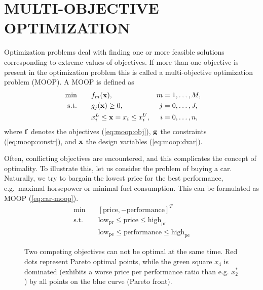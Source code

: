 \documentclass[%
preprint,
preprint,
linenumbers,
amsmath,amssymb,
aps,
prstab,
]{revtex4-1}
\begin{document}
\section{MULTI-OBJECTIVE OPTIMIZATION} \label{sec:optimization}

Optimization problems deal with finding one or more feasible solutions
  corresponding to extreme values of objectives.
If more than one objective is present in the optimization problem this is called
  a multi-objective optimization problem (MOOP).
A MOOP is defined as
%
\begin{align}
  \text{ min} \quad & \quad f_m({\bf x}), ~& m &= 1, \dots, M, \label{eq:moop:obj}\\
  \text{s.t.} \quad & \quad g_j({\bf x}) \geq 0, & j &= 0, \dots, J,
  \label{eq:moop:constr}\\
  \quad & \quad  x_i^L \leq {\bf x}=x_i \leq x_i^U,& i &=0, \dots, n
  \label{eq:moop:dvar} \text{,}
\end{align}
%
where $\bf f$ denotes the objectives (\ref{eq:moop:obj}),
  $\bf g$ the constraints (\ref{eq:moop:constr}),
  and $\bf x$ the design variables (\ref{eq:moop:dvar}).

Often, conflicting objectives are encountered, and this complicates the concept of
  optimality.
To illustrate this, let us consider the problem of buying a car.
Naturally, we try to bargain the lowest price for the best performance,
  e.g.\ maximal horsepower or minimal fuel consumption.
This can be formulated as MOOP (\ref{eq:car-moop}).
%
\begin{equation}
  \begin{array}{cl}
  \min          & \quad \left[ \text{price}, -\text{performance} \right]^T \\
    \text{s.t.} & \quad \text{low}_\text{pr} \leq \text{price} \leq \text{high}_\text{pr}\\
                & \quad \text{low}_\text{pe} \leq \text{performance} \leq \text{high}_\text{pe}
  \end{array}
  \label{eq:car-moop}
\end{equation}

\begin{figure}
  \begin{center}
    \begin{tikzpicture}[scale=1.3, transform shape]
      
    \end{tikzpicture}
  \end{center}
  \caption{Two competing objectives can not be optimal at the same time.
    Red dots represent Pareto optimal points, while the green square $x_4$ is
    dominated (exhibits a worse price per performance ratio than e.g. $x_2^*$)
    by all points on the blue curve (Pareto front).
  }
  \label{fig:tradeoff}
\end{figure}
\end{document}

